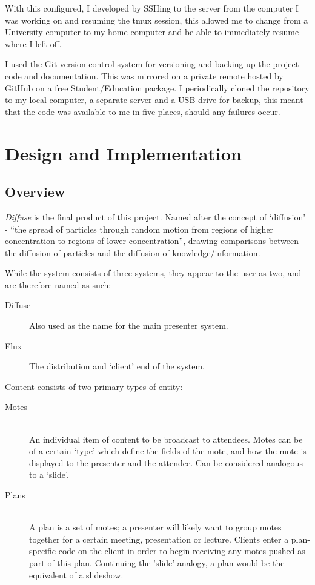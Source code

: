 \documentclass[a4papert,11pt,notitlepage]{ltxdoc}
\begin{document}
With this configured, I developed by SSHing to the server from the computer I was working on and resuming the tmux session, this allowed me to change from a University computer to my home computer and be able to immediately resume where I left off.

I used the Git\cite{git:web} version control system for versioning and backing up the project code and documentation. This was mirrored on a private remote hosted by GitHub\cite{github:web} on a free Student/Education package. I periodically cloned the repository to my local computer, a separate server and a USB drive for backup, this meant that the code was available to me in five places, should any failures occur.

\section{Design and Implementation}
\subsection{Overview}
\emph{Diffuse} is the final product of this project. Named after the concept of `diffusion' - ``the spread of particles through random motion from regions of higher concentration to regions of lower concentration''\cite{diffusionwikipedia:web}, drawing comparisons between the diffusion of particles and the diffusion of knowledge/information.

While the system consists of three systems, they appear to the user as two, and are therefore named as such:
\begin{description}
\item[Diffuse]
Also used as the name for the main presenter system.
\item[Flux]
The distribution and `client' end of the system.
\end{description}

Content consists of two primary types of entity:
\begin{description}
\item[Motes] \hfill \\
An individual item of content to be broadcast to attendees. Motes can be of a certain `type' which define the fields of the mote, and how the mote is displayed to the presenter and the attendee. Can be considered analogous to a `slide'.
\item[Plans] \hfill \\
A plan is a set of motes; a presenter will likely want to group motes together for a certain meeting, presentation or lecture. Clients enter a plan-specific code on the client in order to begin receiving any motes pushed as part of this plan. Continuing the 'slide' analogy, a plan would be the equivalent of a slideshow.
\end{description}
\end{document}
